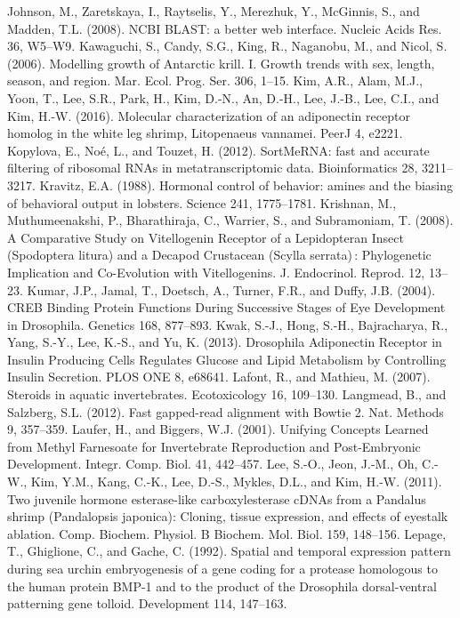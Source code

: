 Johnson, M., Zaretskaya, I., Raytselis, Y., Merezhuk, Y., McGinnis, S., and Madden, T.L. (2008). NCBI BLAST: a better web interface. Nucleic Acids Res. 36, W5–W9.
Kawaguchi, S., Candy, S.G., King, R., Naganobu, M., and Nicol, S. (2006). Modelling growth of Antarctic krill. I. Growth trends with sex, length, season, and region. Mar. Ecol. Prog. Ser. 306, 1–15.
Kim, A.R., Alam, M.J., Yoon, T., Lee, S.R., Park, H., Kim, D.-N., An, D.-H., Lee, J.-B., Lee, C.I., and Kim, H.-W. (2016). Molecular characterization of an adiponectin receptor homolog in the white leg shrimp, Litopenaeus vannamei. PeerJ 4, e2221.
Kopylova, E., Noé, L., and Touzet, H. (2012). SortMeRNA: fast and accurate filtering of ribosomal RNAs in metatranscriptomic data. Bioinformatics 28, 3211–3217.
Kravitz, E.A. (1988). Hormonal control of behavior: amines and the biasing of behavioral output in lobsters. Science 241, 1775–1781.
Krishnan, M., Muthumeenakshi, P., Bharathiraja, C., Warrier, S., and Subramoniam, T. (2008). A Comparative Study on Vitellogenin Receptor of a Lepidopteran Insect (Spodoptera litura) and a Decapod Crustacean (Scylla serrata) : Phylogenetic Implication and Co-Evolution with Vitellogenins. J. Endocrinol. Reprod. 12, 13–23.
Kumar, J.P., Jamal, T., Doetsch, A., Turner, F.R., and Duffy, J.B. (2004). CREB Binding Protein Functions During Successive Stages of Eye Development in Drosophila. Genetics 168, 877–893.
Kwak, S.-J., Hong, S.-H., Bajracharya, R., Yang, S.-Y., Lee, K.-S., and Yu, K. (2013). Drosophila Adiponectin Receptor in Insulin Producing Cells Regulates Glucose and Lipid Metabolism by Controlling Insulin Secretion. PLOS ONE 8, e68641.
Lafont, R., and Mathieu, M. (2007). Steroids in aquatic invertebrates. Ecotoxicology 16, 109–130.
Langmead, B., and Salzberg, S.L. (2012). Fast gapped-read alignment with Bowtie 2. Nat. Methods 9, 357–359.
Laufer, H., and Biggers, W.J. (2001). Unifying Concepts Learned from Methyl Farnesoate for Invertebrate Reproduction and Post-Embryonic Development. Integr. Comp. Biol. 41, 442–457.
Lee, S.-O., Jeon, J.-M., Oh, C.-W., Kim, Y.M., Kang, C.-K., Lee, D.-S., Mykles, D.L., and Kim, H.-W. (2011). Two juvenile hormone esterase-like carboxylesterase cDNAs from a Pandalus shrimp (Pandalopsis japonica): Cloning, tissue expression, and effects of eyestalk ablation. Comp. Biochem. Physiol. B Biochem. Mol. Biol. 159, 148–156.
Lepage, T., Ghiglione, C., and Gache, C. (1992). Spatial and temporal expression pattern during sea urchin embryogenesis of a gene coding for a protease homologous to the human protein BMP-1 and to the product of the Drosophila dorsal-ventral patterning gene tolloid. Development 114, 147–163.
